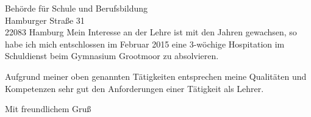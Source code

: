 \documentclass[ebner,paper=a4,fontsize=11pt,ngerman,BCOR=10mm]{scrlttr2}%
\begin{document}
\begin{letter}{ Beh{\"o}rde f{\"u}r Schule und Berufsbildung\\
Hamburger Stra{\ss}e 31\\ 
22083 Hamburg}
Mein Interesse an der Lehre ist mit den Jahren gewachsen, so habe ich mich
entschlossen im Februar 2015 eine 3-w{\"o}chige Hospitation im Schuldienst beim
Gymnasium Grootmoor zu absolvieren.


%

Aufgrund meiner oben genannten T{\"a}tigkeiten entsprechen meine Qualit{\"a}ten und
Kompetenzen sehr gut den Anforderungen einer T{\"a}tigkeit als Lehrer. 


\closing{Mit freundlichem Gru\ss}
\enlargethispage{6\baselineskip}

\end{letter}
\end{document}

